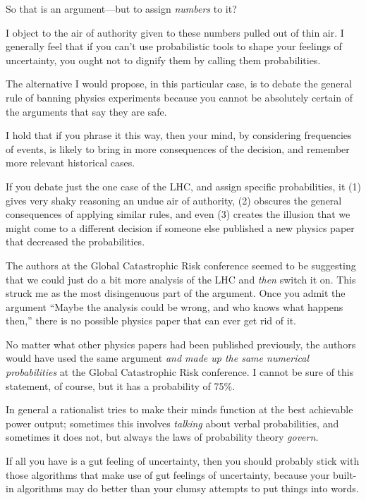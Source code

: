 {
 So that is an argument---but to assign \textit{numbers} to it?}

{
 I object to the air of authority given to these numbers pulled out
of thin air. I generally feel that if you can't use
probabilistic tools to shape your feelings of uncertainty, you ought
not to dignify them by calling them probabilities.}

{
 The alternative I would propose, in this particular case, is to
debate the general rule of banning physics experiments because you
cannot be absolutely certain of the arguments that say they are safe.}

{
 I hold that if you phrase it this way, then your mind, by
considering frequencies of events, is likely to bring in more
consequences of the decision, and remember more relevant historical
cases.}

{
 If you debate just the one case of the LHC, and assign specific
probabilities, it (1) gives very shaky reasoning an undue air of
authority, (2) obscures the general consequences of applying similar
rules, and even (3) creates the illusion that we might come to a
different decision if someone else published a new physics paper that
decreased the probabilities.}

{
 The authors at the Global Catastrophic Risk conference seemed to
be suggesting that we could just do a bit more analysis of the LHC and
\textit{then} switch it on. This struck me as the most disingenuous
part of the argument. Once you admit the argument
``Maybe the analysis could be wrong, and who knows
what happens then,'' there is no possible physics
paper that can ever get rid of it.}

{
 No matter what other physics papers had been published previously,
the authors would have used the same argument \textit{and made up the
same numerical probabilities} at the Global Catastrophic Risk
conference. I cannot be sure of this statement, of course, but it has a
probability of 75\%.}

{
 In general a rationalist tries to make their minds function at the
best achievable power output; sometimes this involves \textit{talking}
about verbal probabilities, and sometimes it does not, but always the
laws of probability theory \textit{govern.}}

{
 If all you have is a gut feeling of uncertainty, then you should
probably stick with those algorithms that make use of gut feelings of
uncertainty, because your built-in algorithms may do better than your
clumsy attempts to put things into words.}

